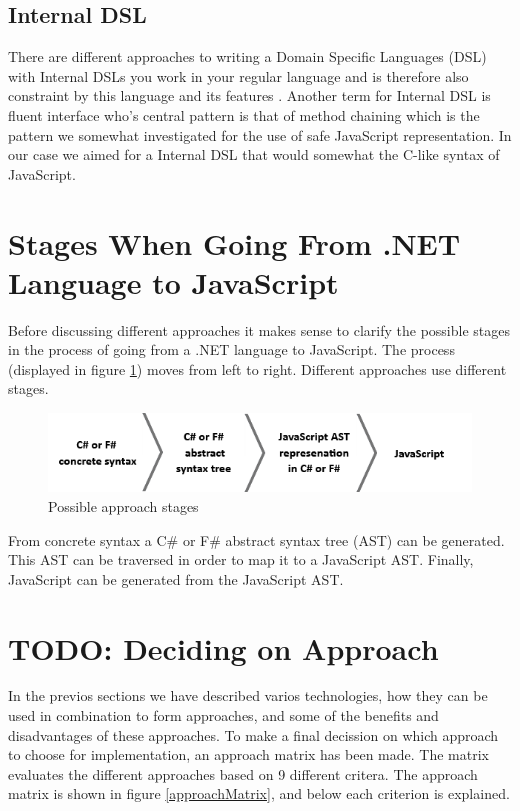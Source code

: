 	\subsection{Internal DSL} %
	\label{ssub:internal_dsl}
		There are different approaches to writing a Domain Specific Languages (DSL) with Internal DSLs you work in your regular language and is therefore also constraint by this language and its features \cite{domain_specific_languages}. Another term for Internal DSL is fluent interface who's central pattern is that of method chaining which is the pattern we somewhat investigated for the use of safe JavaScript representation. In our case we aimed for a Internal DSL that would somewhat the C-like syntax of JavaScript.

\section{Stages When Going From .NET Language to JavaScript} %
\label{sec:stages_when_going_from_net_language_to_javascript}
	Before discussing different approaches it makes sense to clarify the possible stages in the process of going from a .NET language to JavaScript. The process (displayed in figure \ref{stages}) moves from left to right. Different approaches use different stages.

				\begin{figure}[H]
			\begin{center}
				\centerline{\includegraphics[width=14cm]{resources/images/stages.png}}
			\end{center}
			\caption{Possible approach stages}
			\label{stages}
		\end{figure}

	 From concrete syntax a C\# or F\# abstract syntax tree (AST) can be generated. This AST can be traversed in order to map it to a JavaScript AST. Finally, JavaScript can be generated from the JavaScript AST.



\section{TODO: Deciding on Approach} %
\label{sec:deciding_on_approach}
	In the previos sections we have described varios technologies, how they can be used in combination to form approaches, and some of the benefits and disadvantages of these approaches. To make a final decission on which approach to choose for implementation, an approach matrix has been made. The matrix evaluates the different approaches based on 9 different critera. The approach matrix is shown in figure \ref{approachMatrix}, and below each criterion is explained.

